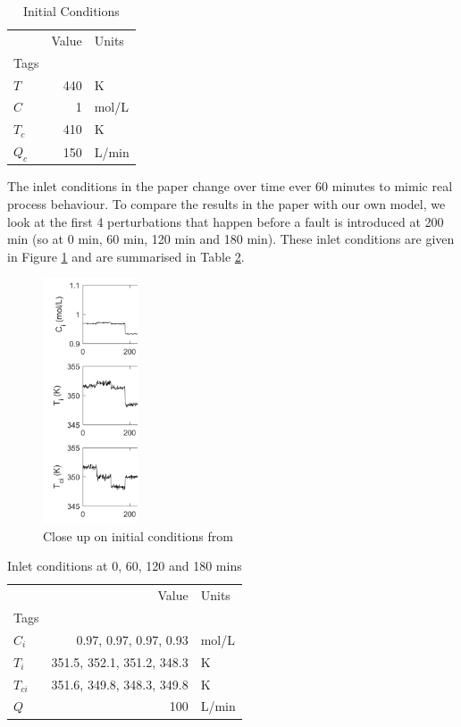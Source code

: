 \documentclass{article}
\begin{document}
 

\begin{table}[H]
	\caption{Initial Conditions}
	\label{tab:intial_conditions}
	\centering
	\begin{tabular}{lrl}
		\toprule
		{} &  Value &  Units \\
		Tags &        &        \\
		\midrule
		$T$  &     440 &  K \\
		$C$  &    1 &   mol/L \\
		$T_c$  &    410 &   K \\
		$Q_c$  &    150 &   L/min \\
	\end{tabular}
\end{table}

The inlet conditions in the paper change over time ever 60 minutes to mimic real process behaviour. To compare the results in the paper with our own model, we look at the first 4 perturbations that happen before a fault is introduced at 200 min (so at 0 min, 60 min, 120 min and 180 min). These inlet conditions are given in Figure \ref{inlet_conditions_closeup} and are summarised in Table \ref{tab:inlet_conditions}.

\begin{figure}[H]
	\centering
	\includegraphics[width=0.25\textwidth]{img/inlet_conditions_closeup}
	\caption{Close up on initial conditions from \cite{pilario2018canonical}}
	\label{inlet_conditions_closeup}
\end{figure}


\begin{table}[H]
	\caption{Inlet conditions at 0, 60, 120 and 180 mins}
	\label{tab:inlet_conditions}
	\centering
	\begin{tabular}{lrl}
		\toprule
		{} &  Value &  Units \\
		Tags &        &        \\
		\midrule
		$C_i$  &      0.97, 0.97, 0.97, 0.93 &  mol/L \\
		$T_i$  &    351.5, 352.1, 351.2, 348.3
	 &      K \\
		$T_{ci}$ &    351.6, 349.8, 348.3, 349.8 &      K \\
		$Q$ &    100 &      L/min \\
		\bottomrule
	\end{tabular}
\end{table}
\end{document}
